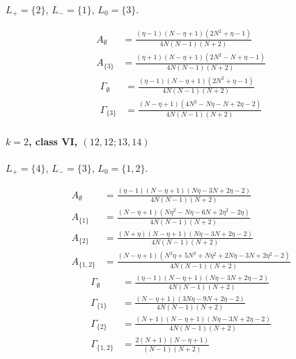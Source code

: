 \documentclass[11pt]{article}
\begin{document}
$L_+=\{2\}$, $L_-=\{1\}$, $L_0=\{3\}$.

\begin{align*}
  A_{\emptyset} &= \frac{\left(\eta - 1\right) \left(N - \eta + 1\right) \left(2 N^{2} + \eta - 1\right)}{4 N \left(N - 1\right) \left(N + 2\right)} \\
  A_{\{3\}} &= \frac{\left(\eta + 1\right) \left(N - \eta + 1\right) \left(2 N^{2} - N + \eta - 1\right)}{4 N \left(N - 1\right) \left(N + 2\right)} 
\end{align*}
\begin{align*}
  \Gamma_{\emptyset} &= \frac{\left(\eta - 1\right) \left(N - \eta + 1\right) \left(2 N^{2} + \eta - 1\right)}{4 N \left(N - 1\right) \left(N + 2\right)} \\
  \Gamma_{\{3\}} &= \frac{\left(N - \eta + 1\right) \left(4 N^{2} - N \eta - N + 2 \eta - 2\right)}{4 N \left(N - 1\right) \left(N + 2\right)} 
\end{align*}

\paragraph{$k=2$, class VI, $(12,12;13,14)$}

$L_+=\{4\}$, $L_-=\{3\}$, $L_0=\{1,2\}$.

\begin{align*}
  A_{\emptyset} &= \frac{\left(\eta - 1\right) \left(N - \eta + 1\right) \left(N \eta - 3 N + 2 \eta - 2\right)}{4 N \left(N - 1\right) \left(N + 2\right)} \\
  A_{\{1\}} &= \frac{\left(N - \eta + 1\right) \left(N \eta^{2} - N \eta - 6 N + 2 \eta^{2} - 2 \eta\right)}{4 N \left(N - 1\right) \left(N + 2\right)} \\
  A_{\{2\}} &= \frac{\left(N + \eta\right) \left(N - \eta + 1\right) \left(N \eta - 3 N + 2 \eta - 2\right)}{4 N \left(N - 1\right) \left(N + 2\right)} \\
  A_{\{1,2\}} &= \frac{\left(N - \eta + 1\right) \left(N^{2} \eta + 5 N^{2} + N \eta^{2} + 2 N \eta - 3 N + 2 \eta^{2} - 2\right)}{4 N \left(N - 1\right) \left(N + 2\right)} 
\end{align*}
\begin{align*}
  \Gamma_{\emptyset} &= \frac{\left(\eta - 1\right) \left(N - \eta + 1\right) \left(N \eta - 3 N + 2 \eta - 2\right)}{4 N \left(N - 1\right) \left(N + 2\right)} \\
  \Gamma_{\{1\}} &= \frac{\left(N - \eta + 1\right) \left(3 N \eta - 9 N + 2 \eta - 2\right)}{4 N \left(N - 1\right) \left(N + 2\right)} \\
  \Gamma_{\{2\}} &= \frac{\left(N + 1\right) \left(N - \eta + 1\right) \left(N \eta - 3 N + 2 \eta - 2\right)}{4 N \left(N - 1\right) \left(N + 2\right)} \\
  \Gamma_{\{1,2\}} &= \frac{2 \left(N + 1\right) \left(N - \eta + 1\right)}{\left(N - 1\right) \left(N + 2\right)} 
\end{align*}
\end{document}
